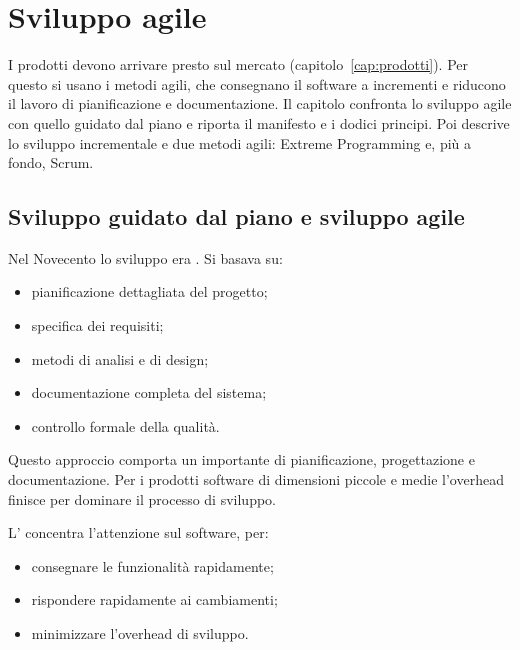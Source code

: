 \chapter{Sviluppo agile}
\label{cap:agile}

\begin{inbreve}
I prodotti devono arrivare presto sul mercato (capitolo~\ref{cap:prodotti}). Per questo si usano i metodi agili,
che consegnano il software a incrementi e riducono il lavoro di pianificazione e documentazione. Il capitolo
confronta lo sviluppo agile con quello guidato dal piano e riporta il manifesto e i dodici principi. Poi
descrive lo sviluppo incrementale e due metodi agili: Extreme Programming e, più a fondo, Scrum.
\end{inbreve}

\section{Sviluppo guidato dal piano e sviluppo agile}
\label{sec:agile-confronto}

Nel Novecento lo sviluppo era . Si basava su:
\begin{itemize}
  \item pianificazione dettagliata del progetto;
  \item specifica dei requisiti;
  \item metodi di analisi e di design;
  \item documentazione completa del sistema;
  \item controllo formale della qualità.
\end{itemize}

Questo approccio comporta un  importante di pianificazione, progettazione e documentazione. Per i
prodotti software di dimensioni piccole e medie l'overhead finisce per dominare il processo di sviluppo.

\begin{definizione}
L' concentra l'attenzione sul software, per:
\begin{itemize}
  \item consegnare le funzionalità rapidamente;
  \item rispondere rapidamente ai cambiamenti;
  \item minimizzare l'overhead di sviluppo.
\end{itemize}
\end{definizione}

